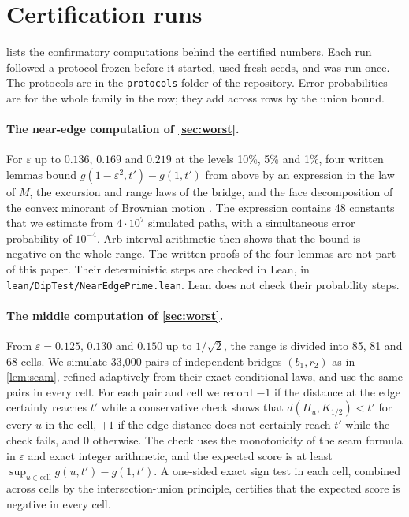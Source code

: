 \section{Certification runs}\label{app:cert}

 lists the confirmatory computations behind the certified numbers. Each run followed a protocol frozen before it started, used fresh seeds, and was run once. The protocols are in the \texttt{protocols} folder of the repository. Error probabilities are for the whole family in the row; they add across rows by the union bound.

\paragraph{The near-edge computation of \cref{sec:worst}.} For $\varepsilon$ up to $0.136$, $0.169$ and $0.219$ at the levels 10\%, 5\% and 1\%, four written lemmas bound $g(1-\varepsilon^2,t')-g(1,t')$ from above by an expression in the law of $M$, the excursion and range laws of the bridge, and the face decomposition of the convex minorant of Brownian motion \cite{PUB12}. The expression contains 48 constants that we estimate from $4\cdot10^7$ simulated paths, with a simultaneous error probability of $10^{-4}$. Arb interval arithmetic then shows that the bound is negative on the whole range. The written proofs of the four lemmas are not part of this paper. Their deterministic steps are checked in Lean, in \texttt{lean/DipTest/NearEdgePrime.lean}. Lean does not check their probability steps.

\paragraph{The middle computation of \cref{sec:worst}.} From $\varepsilon=0.125$, $0.130$ and $0.150$ up to $1/\sqrt2$, the range is divided into 85, 81 and 68 cells. We simulate 33,000 pairs of independent bridges $(b_1,r_2)$ as in \cref{lem:seam}, refined adaptively from their exact conditional laws, and use the same pairs in every cell. For each pair and cell we record $-1$ if the distance at the edge certainly reaches $t'$ while a conservative check shows that $d(H_u,K_{1/2})<t'$ for every $u$ in the cell, $+1$ if the edge distance does not certainly reach $t'$ while the check fails, and $0$ otherwise. The check uses the monotonicity of the seam formula in $\varepsilon$ and exact integer arithmetic, and the expected score is at least $\sup_{u\in\text{cell}}g(u,t')-g(1,t')$. A one-sided exact sign test in each cell, combined across cells by the intersection-union principle, certifies that the expected score is negative in every cell.

